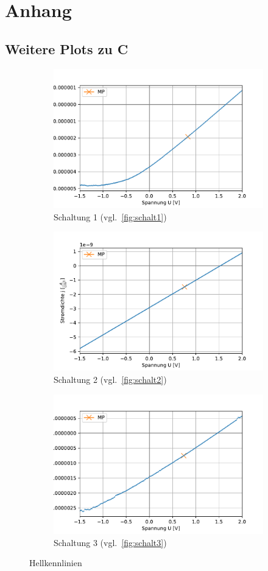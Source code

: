 \documentclass[slug=SZ, room=Hermann-Krone-Bau\,\ Labor\ 1.25, supervisor=Martin\ Kroll]{../../Lab_Report_LaTeX/lab_report}
\begin{document}
\section{Anhang}
\label{sec:anh}

\subsection{Weitere Plots zu C}
\label{sec:plotsc}

\begin{figure}[H]\centering
\begin{subfigure}[b]{1\textwidth}\centering
	\includegraphics[width=.5\columnwidth]{figs/python/C/3x3_schaltung_2.pdf}
	\caption{Schaltung 1 (vgl.~\ref{fig:schalt1})}
	\label{diag:hellschalt1}
\end{subfigure}
\begin{subfigure}[b]{1\textwidth}\centering
	\includegraphics[width=.5\columnwidth]{figs/python/C/3x3_schaltung_3.pdf}
	\caption{Schaltung 2 (vgl.~\ref{fig:schalt2})}
	\label{diag:hellschalt2}
\end{subfigure}
\begin{subfigure}[b]{1\textwidth}\centering
	\includegraphics[width=.5\columnwidth]{figs/python/C/3x3_schaltung_4.pdf}
	\caption{Schaltung 3 (vgl.~\ref{fig:schalt3})}
	\label{diag:hellschalt3}
\end{subfigure}
	\caption{Hellkennlinien}
	\label{fig:hellkenn}
\end{figure}
\end{document}
